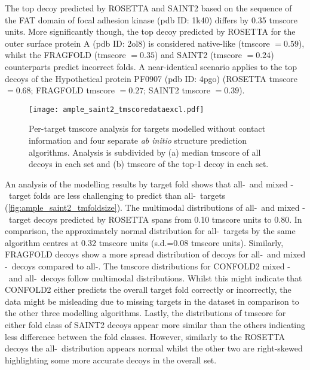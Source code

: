 The top decoy predicted by ROSETTA and SAINT2 based on the sequence of the FAT domain of focal adhesion kinase (\gls{pdb} ID: 1k40) differs by 0.35 \gls{tmscore} units. More significantly though, the top decoy predicted by ROSETTA for the outer surface protein A (\gls{pdb} ID: 2ol8) is considered native-like (\gls{tmscore} $=0.59$), whilst the FRAGFOLD (\gls{tmscore} $=0.35$) and SAINT2 (\gls{tmscore} $=0.24$) counterparts predict incorrect folds. A near-identical scenario applies to the top decoys of the Hypothetical protein PF0907 (\gls{pdb} ID: 4pgo) (ROSETTA \gls{tmscore} $=0.68$; FRAGFOLD \gls{tmscore} $=0.27$; SAINT2 \gls{tmscore} $=0.39$).

\begin{figure}[H]
    \centering
    \texttt{[image: ample\_saint2\_tmscoredataexcl.pdf]}
    \caption[TM-score analysis for four modelling algorithms]{Per-target \gls{tmscore} analysis for targets modelled without contact information and four separate \textit{ab initio} structure prediction algorithms. Analysis is subdivided by (a) median \gls{tmscore} of all decoys in each set and (b) \gls{tmscore} of the top-1 decoy in each set.}
    \label{fig:ample_saint2_tmscoredataexcl}
\end{figure}

An analysis of the modelling results by target fold shows that all-\textalpha\ and mixed \textalpha-\textbeta\ target folds are less challenging to predict than all-\textbeta\ targets (\cref{fig:ample_saint2_tmfoldsize}). The multimodal distributions of all-\textalpha\ and mixed \textalpha-\textbeta\ target decoys predicted by ROSETTA spans from 0.10 \gls{tmscore} units to 0.80. In comparison, the approximately normal distribution for all-\textbeta\ targets by the same algorithm centres at 0.32 \gls{tmscore} units (s.d.=0.08 \gls{tmscore} units). Similarly, FRAGFOLD decoys show a more spread distribution of decoys for all-\textalpha\ and mixed \textalpha-\textbeta\ decoys compared to all-\textbeta. The \gls{tmscore} distributions for CONFOLD2 mixed \textalpha-\textbeta\ and all-\textbeta\ decoys follow multimodal distributions. Whilst this might indicate that CONFOLD2 either predicts the overall target fold correctly or incorrectly, the data might be misleading due to missing targets in the dataset in comparison to the other three modelling algorithms. Lastly, the distributions of \gls{tmscore} for either fold class of SAINT2 decoys appear more similar than the others indicating less difference between the fold classes. However, similarly to the ROSETTA decoys the all-\textbeta\ distribution appears normal whilst the other two are right-skewed highlighting some more accurate decoys in the overall set.

